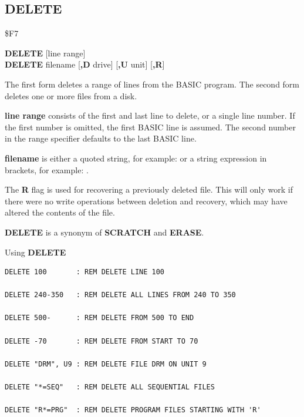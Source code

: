 \subsection{DELETE}
\begin{description}[leftmargin=2cm,style=nextline]
\item [Token:]   \$F7

\item [Format:]  {\bf DELETE} [line range] \\
                 {\bf DELETE} filename [{\bf,D} drive] [{\bf,U} unit] [{\bf,R}]

\item [Usage:]   The first form deletes a range of lines from the BASIC program. The second form deletes one or more files from a disk.

                 {\bf line range} consists of the first and last line to delete, or a single line number. If the first number is omitted, the first BASIC line is assumed. The second number in the range specifier defaults to the last BASIC line.

                 {\bf filename} is either a quoted string, for example:  or a string expression in brackets, for example: .

                 \drivedefinition

                 \unitdefinition

                 The {\bf R} flag is used for recovering a previously deleted file. This will only work if there were no write operations between deletion and recovery, which may have altered the contents of the file.

\item [Remarks:] {\bf DELETE} is a synonym of {\bf SCRATCH} and {\bf ERASE}.

\item [Examples:] Using {\bf DELETE}

\begin{tcolorbox}[colback=black,coltext=white]
\verbatimfont{\codefont}
\begin{verbatim}
DELETE 100       : REM DELETE LINE 100

DELETE 240-350   : REM DELETE ALL LINES FROM 240 TO 350

DELETE 500-      : REM DELETE FROM 500 TO END

DELETE -70       : REM DELETE FROM START TO 70

DELETE "DRM", U9 : REM DELETE FILE DRM ON UNIT 9

DELETE "*=SEQ"   : REM DELETE ALL SEQUENTIAL FILES

DELETE "R*=PRG"  : REM DELETE PROGRAM FILES STARTING WITH 'R'
\end{verbatim}
\end{tcolorbox}
\end{description}


